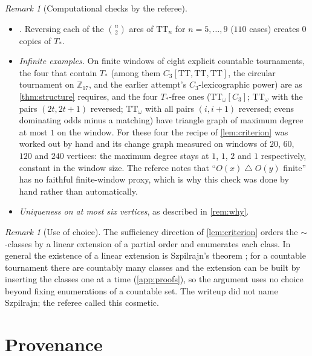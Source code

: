 \documentclass[11pt,a4paper]{article}
\theoremstyle{plain}
\theoremstyle{definition}
\theoremstyle{remark}
\newtheorem{remark}[theorem]{Remark}
\newcommand{\Tstar}{T_{\ast}}
\newcommand{\TT}{\mathrm{TT}}
\newcommand{\symdiff}{\mathbin{\triangle}}
\begin{document}
\begin{remark}[Computational checks by the referee]
\begin{itemize}
The bound $2$ is attained at $n=7$, so the constant in \cref{lem:Pempty} is tight. A further $24$ $\Tstar$-free tournaments on $8$, $9$, $10$ and $12$ vertices found by randomised local search satisfy both conclusions.
\item \emph{.} Reversing each of the $\binom n2$ arcs of $\TT_n$ for $n=5,\dots,9$ ($110$ cases) creates $0$ copies of $\Tstar$.
\item \emph{Infinite examples.} On finite windows of eight explicit countable tournaments, the four that contain $\Tstar$ (among them $C_3[\TT,\TT,\TT]$, the circular tournament on $\mathbb Z_{17}$, and the earlier attempt's $C_3$-lexicographic power) are as \cref{thm:structure} requires, and the four $\Tstar$-free ones ($\TT_\omega[C_3]$; $\TT_\omega$ with the pairs $(2t,2t+1)$ reversed; $\TT_\omega$ with all pairs $(i,i+1)$ reversed; evens dominating odds minus a matching) have triangle graph of maximum degree at most $1$ on the window. For these four the recipe of \cref{lem:criterion} was worked out by hand and its change graph measured on windows of $20$, $60$, $120$ and $240$ vertices: the maximum degree stays at $1$, $1$, $2$ and $1$ respectively, constant in the window size. The referee notes that ``$O(x)\symdiff O(y)$ finite'' has no faithful finite-window proxy, which is why this check was done by hand rather than automatically.
\item \emph{Uniqueness on at most six vertices}, as described in \cref{rem:why}.
\end{itemize}
\end{remark}

\begin{remark}[Use of choice]\label{rem:choice}
The sufficiency direction of \cref{lem:criterion} orders the $\sim$-classes by a linear extension of a partial order and enumerates each class. In general the existence of a linear extension is Szpilrajn's theorem \cite{Sz30}; for a countable tournament there are countably many classes and the extension can be built by inserting the classes one at a time (\cref{app:proofs}), so the argument uses no choice beyond fixing enumerations of a countable set. The writeup did not name Szpilrajn; the referee called this cosmetic.
\end{remark}

\section{Provenance}\label{sec:provenance}
\end{document}
